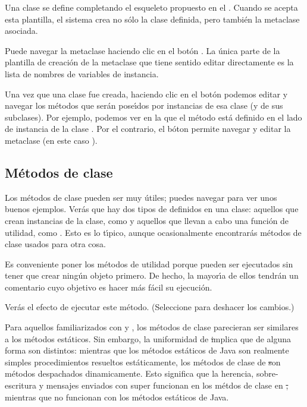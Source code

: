 \documentclass[a4paper,10pt,twoside]{book}
\begin{document}
Una clase se define completando el esqueleto propuesto en el  . 
Cuando se acepta esta plantilla, el sistema crea no s\'olo la clase definida, pero tambi\'en la metaclase asociada.

Puede navegar la metaclase haciendo clic en el bot\'on .
La \'unica parte de la plantilla de creaci\'on de la metaclase que tiene sentido editar directamente es la lista de nombres de variables de instancia.

Una vez que una clase fue creada, haciendo clic en el bot\'on  podemos editar y navegar los m\'etodos  que ser\'an pose\'\i{}dos por instancias de esa clase (y de sus subclases). Por ejemplo, podemos ver en la  que el m\'etodo  est\'a definido en el lado de instancia de la clase  .
Por el contrario, el b\'oton   permite navegar y editar la metaclase (en este caso ).

\subsection{M\'etodos de clase} 

Los m\'etodos de clase pueden ser muy \'utiles; puedes navegar  para ver unos buenos ejemplos.
Ver\'as que hay dos tipos de  definidos en una clase: aquellos que crean instancias de la clase, como  y aquellos que llevan a cabo una funci\'on de utilidad, como . 
Esto es lo t\'\i{}pico, aunque ocasionalmente encontrar\'as m\'etodos de clase usados para otra cosa.  

Es conveniente poner los m\'etodos de utilidad  porque pueden ser ejecutados sin tener que crear ning\'un objeto primero.
De hecho, la mayor\'\i{}a de ellos tendr\'an un comentario cuyo objetivo es hacer m\'as f\'acil su ejecuci\'on.

Ver\'as el efecto de ejecutar este m\'etodo. (Seleccione  para deshacer los cambios.)


Para aquellos familiarizados con  y , los m\'etodos de clase parecieran ser similares a los m\'etodos est\'aticos.
Sin embargo, la uniformidad de \st implica que de alguna forma son distintos: mientras que los m\'etodos est\'aticos de Java son realmente simples procedimientos resueltos est\'aticamente, los m\'etodos de clase de \st son m\'etodos despachados dinamicamente. 
Esto significa que la herencia, sobre-escritura y mensajes enviados con super funcionan en los m\'etdos de clase en \st, mientras que no funcionan con los m\'etodos est\'aticos de Java.
\end{document}
